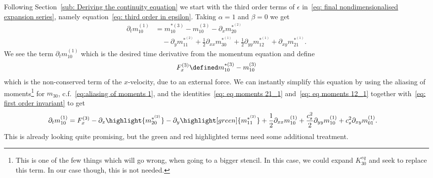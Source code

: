 Following Section~\ref{sub: Deriving the continuity equation} we start with the third order terms of
$\epsilon$ in~\eqref{eq: final nondimensionalised expansion series}, namely equation~\eqref{eq: third order in epsilon}.
Taking $\alpha=1$ and $\beta=0$ we get
\begin{equation}
  \begin{aligned}
     \partial_t m_{10}^{(1)} & =
    m_{10}^{*(3)} - m_{10}^{(3)} - \partial_x m_{20}^{*^{(2)}} \\
    &\quad - \partial_y m_{11}^{*^{(2)}} + \frac{1}{2}\partial_{xx} m_{30}^{*^{(1)}} + \frac{1}{2} \partial_{yy} m_{12}^{*^{(1)}} + \partial_{xy} m_{21}^{*^{(1)}}.
  \end{aligned}
\end{equation}
We see the term $\partial_t m_{10}^{(1)} $ which is the desired time derivative from the momentum equation and define
\begin{equation}
   F_x^{(3)}\defined m_{10}^{*(3)} - m_{10}^{(3)}
\end{equation}
which is the non-conserved term of the $x$-velocity, due to an external force.
We can instantly simplify this equation by using the aliasing of moments\footnote{This is one of the few things which will go wrong, when going to a bigger stencil.
In this case, we could expand $K_{30}^{eq}$ and seek to replace this term.
In our case though, this is not needed.} for $m_{30}$, c.f.~\eqref{eq:aliasing of moments 1}, and the identities~\eqref{eq: eq moments 21_1}
and~\eqref{eq: eq moments 12_1} together with~\eqref{eq: first order invariant} to get
\begin{equation}
  \label{eq: start of momentum equation derivation}
  \begin{aligned}
    \partial_t m_{10}^{(1)} & =
    F_x^{(3)} - \partial_x \highlight{m_{20}^{*^{(2)}}} - \partial_y \highlight[green]{m_{11}^{*^{(2)}}} + \frac{1}{2}\partial_{xx} m_{10}^{(1)} + \frac{c_s^2}{2} \partial_{yy} m_{10}^{(1)} + c_s^2\partial_{xy} m_{01}^{(1)}.
  \end{aligned}
\end{equation}
This is already looking quite promising, but the green and red highlighted terms need some additional treatment.

